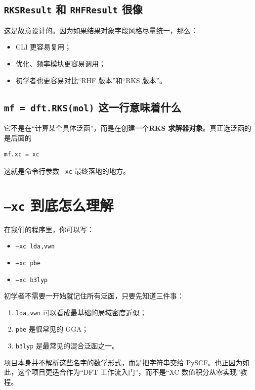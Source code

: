 \documentclass[UTF8,11pt,fontset=fandol]{ctexbook}
\begin{document}


\subsection*{\texttt{RKSResult} 和 \texttt{RHFResult} 很像}

这是故意设计的。因为如果结果对象字段风格尽量统一，那么：
\begin{itemize}
  \item CLI 更容易复用；
  \item 优化、频率模块更容易调用；
  \item 初学者也更容易对比“RHF 版本”和“RKS 版本”。
\end{itemize}

\subsection*{\texttt{mf = dft.RKS(mol)} 这一行意味着什么}

它不是在“计算某个具体泛函”，而是在创建一个\textbf{RKS 求解器对象}。真正选泛函的是后面的
\begin{lstlisting}[style=pythonstyle]
mf.xc = xc
\end{lstlisting}

这就是命令行参数 \texttt{--xc} 最终落地的地方。

\section{\texttt{--xc} 到底怎么理解}

在我们的程序里，你可以写：
\begin{itemize}
  \item \texttt{--xc lda,vwn}
  \item \texttt{--xc pbe}
  \item \texttt{--xc b3lyp}
\end{itemize}

初学者不需要一开始就记住所有泛函，只要先知道三件事：
\begin{enumerate}[label=\arabic*.]
  \item \texttt{lda,vwn} 可以看成最基础的局域密度近似；
  \item \texttt{pbe} 是很常见的 GGA；
  \item \texttt{b3lyp} 是最常见的混合泛函之一。
\end{enumerate}

项目本身并不解析这些名字的数学形式，而是把字符串交给 PySCF。也正因为如此，这个项目更适合作为“DFT 工作流入门”，而不是“XC 数值积分从零实现”教程。
\end{document}
